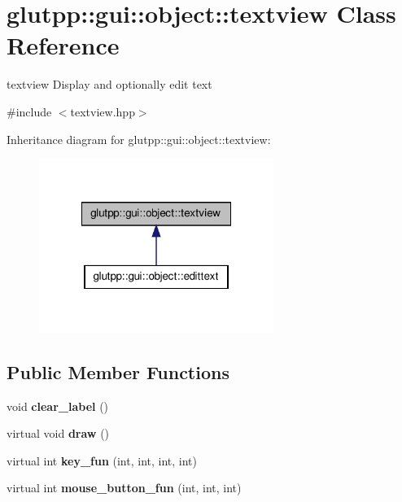 \hypertarget{classglutpp_1_1gui_1_1object_1_1textview}{\section{glutpp\-:\-:gui\-:\-:object\-:\-:textview \-Class \-Reference}
\label{classglutpp_1_1gui_1_1object_1_1textview}
}


textview \-Display and optionally edit text  




{\ttfamily \#include $<$textview.\-hpp$>$}



\-Inheritance diagram for glutpp\-:\-:gui\-:\-:object\-:\-:textview\-:\nopagebreak
\begin{figure}[H]
\begin{center}
\leavevmode
\includegraphics[width=216pt]{classglutpp_1_1gui_1_1object_1_1textview__inherit__graph}
\end{center}
\end{figure}
\subsection*{\-Public \-Member \-Functions}
\begin{DoxyCompactItemize}
\item 
\hypertarget{classglutpp_1_1gui_1_1object_1_1textview_a926a96c785895a5c6a5e18c341b3e19f}{void {\bfseries clear\-\_\-label} ()}\label{classglutpp_1_1gui_1_1object_1_1textview_a926a96c785895a5c6a5e18c341b3e19f}

\item 
\hypertarget{classglutpp_1_1gui_1_1object_1_1textview_a535f913bc264bd4bb4072777109a1dc2}{virtual void {\bfseries draw} ()}\label{classglutpp_1_1gui_1_1object_1_1textview_a535f913bc264bd4bb4072777109a1dc2}

\item 
\hypertarget{classglutpp_1_1gui_1_1object_1_1textview_ae100e01abe28a1028432c40a90348b01}{virtual int {\bfseries key\-\_\-fun} (int, int, int, int)}\label{classglutpp_1_1gui_1_1object_1_1textview_ae100e01abe28a1028432c40a90348b01}

\item 
\hypertarget{classglutpp_1_1gui_1_1object_1_1textview_ad4b0c55f05105dc27621052c479956fd}{virtual int {\bfseries mouse\-\_\-button\-\_\-fun} (int, int, int)}\label{classglutpp_1_1gui_1_1object_1_1textview_ad4b0c55f05105dc27621052c479956fd}

\end{DoxyCompactItemize}


